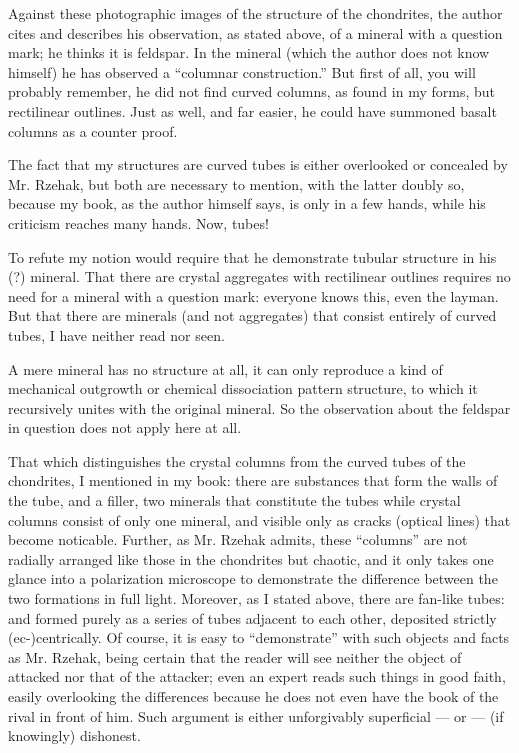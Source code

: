\documentclass[a4paper, 12pt, oneside]{article}
\begin{document}
Against these photographic images of the structure of the chondrites, the author cites and describes his observation, as stated above, of a mineral with a question mark; he thinks it is feldspar. In the mineral (which the author does not know himself) he has observed a ``columnar construction.'' But first of all, you will probably remember, he did not find curved columns, as found in my forms, but rectilinear outlines. Just as well, and far easier, he could have summoned basalt columns as a counter proof.

The fact that my structures are curved tubes is either overlooked or concealed by Mr. Rzehak, but both are necessary to mention, with the latter doubly so, because my book, as the author himself says, is only in a few hands, while his criticism reaches many hands. Now, tubes!

To refute my notion would require that he demonstrate tubular structure in his (?) mineral. That there are crystal aggregates with rectilinear outlines requires no need for a mineral with a question mark: everyone knows this, even the layman. But that there are minerals (and not aggregates) that consist entirely of curved tubes, I have neither read nor seen.

A mere mineral has no structure at all, it can only reproduce a kind of mechanical outgrowth or chemical dissociation pattern structure, to which it recursively unites with the original mineral. So the observation about the feldspar in question does not apply here at all.

That which distinguishes the crystal columns from the curved tubes of the chondrites, I mentioned in my book: there are substances that form the walls of the tube, and a filler, two minerals that constitute the tubes while crystal columns consist of only one mineral, and visible only as cracks (optical lines) that become noticable. Further, as Mr. Rzehak admits, these ``columns'' are not radially arranged like those in the chondrites but chaotic, and it only takes one glance into a polarization microscope to demonstrate the difference between the two formations in full light. Moreover, as I stated above, there are fan-like tubes: and formed purely as a series of tubes adjacent to each other, deposited strictly (ec-)centrically. Of course, it is easy to ``demonstrate'' with such objects and facts as Mr. Rzehak, being certain that the reader will see neither the object of attacked nor that of the attacker; even an expert reads such things in good faith, easily overlooking the differences because he does not even have the book of the rival in front of him. Such argument is either unforgivably superficial --- or --- (if knowingly) dishonest.
\end{document}
